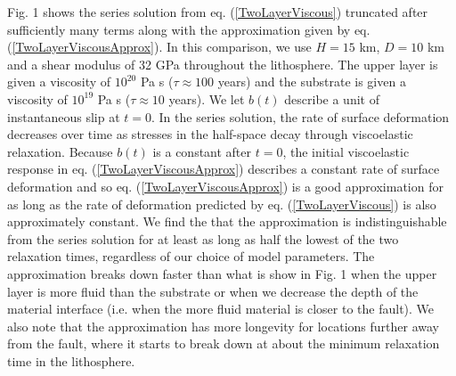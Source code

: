 \documentclass[extra,mreferee]{gji}
\begin{document}
Fig. 1 shows the series solution from eq. (\ref{TwoLayerViscous})
truncated after sufficiently many terms along with the approximation
given by eq. (\ref{TwoLayerViscousApprox}). In this comparison, we use
$H=15$ km, $D=10$ km and a shear modulus of 32 GPa throughout the
lithosphere.  The upper layer is given a viscosity of $10^{20}$ Pa s
($\tau\approx 100$ years) and the substrate is given a viscosity of
$10^{19}$ Pa s ($\tau\approx 10$ years).  We let $b(t)$ describe a
unit of instantaneous slip at $t=0$.  In the series solution, the
rate of surface deformation decreases over time as stresses in the
half-space decay through viscoelastic relaxation.  Because $b(t)$ is a
constant after $t=0$, the initial viscoelastic response in
eq. (\ref{TwoLayerViscousApprox}) describes a constant rate of surface
deformation and so eq. (\ref{TwoLayerViscousApprox}) is a good
approximation for as long as the rate of deformation predicted by
eq. (\ref{TwoLayerViscous}) is also approximately constant. We find
the that the approximation is indistinguishable from the series
solution for at least as long as half the lowest of the two relaxation
times, regardless of our choice of model parameters.  The
approximation breaks down faster than what is show in Fig. 1 when
the upper layer is more fluid than the substrate or when we decrease the
depth of the material interface (i.e. when the more fluid material is
closer to the fault).  We also note that the approximation has more
longevity for locations further away from the fault, where it starts
to break down at about the minimum relaxation time in the lithosphere.
\end{document}
